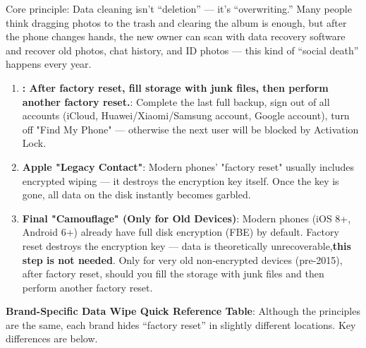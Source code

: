 


Core principle: Data cleaning isn't “deletion” — it's “overwriting.” Many people think dragging photos to the trash and clearing the album is enough, but after the phone changes hands, the new owner can scan with data recovery software and recover old photos, chat history, and ID photos — this kind of “social death” happens every year.

\begin{enumerate}
  \item \textbf{: After factory reset, fill storage with junk files, then perform another factory reset.}: Complete the last full backup, sign out of all accounts (iCloud, Huawei/Xiaomi/Samsung account, Google account), turn off "Find My Phone" — otherwise the next user will be blocked by Activation Lock.
  \item \textbf{Apple "Legacy Contact"}: Modern phones' "factory reset" usually includes encrypted wiping — it destroys the encryption key itself. Once the key is gone, all data on the disk instantly becomes garbled.
  \item \textbf{Final "Camouflage" (Only for Old Devices)}: Modern phones (iOS 8+, Android 6+) already have full disk encryption (FBE) by default. Factory reset destroys the encryption key — data is theoretically unrecoverable,\textbf{this step is not needed}. Only for very old non-encrypted devices (pre-2015), after factory reset, should you fill the storage with junk files and then perform another factory reset.
\end{enumerate}

\textbf{Brand-Specific Data Wipe Quick Reference Table}: Although the principles are the same, each brand hides “factory reset” in slightly different locations. Key differences are below.

